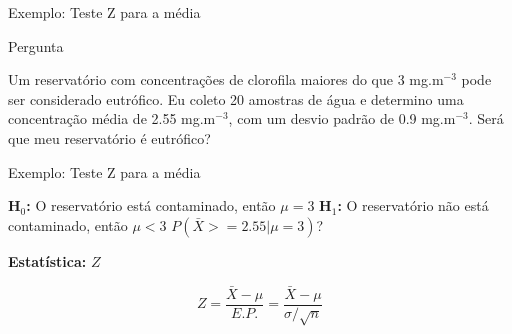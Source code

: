 \documentclass{beamer}\usepackage[]{graphicx}\usepackage[]{color}
\begin{document}
\begin{frame}{Exemplo: Teste Z para a média}

\begin{block}{Pergunta}

Um reservatório com concentrações de clorofila maiores do que 3 mg.m$^{-3}$ pode ser considerado eutrófico. Eu coleto 20 amostras de água e determino uma concentração média de 2.55 mg.m$^{-3}$, com um desvio padrão de 0.9 mg.m$^{-3}$. Será que meu reservatório é eutrófico? 

\end{block}

\end{frame} 

\begin{frame}{Exemplo: Teste Z para a média}

\textbf{H$_0$:} O reservatório está contaminado, então $\mu = 3$
\vfill
\textbf{H$_1$:} O reservatório não está contaminado, então $\mu < 3$
\vfill
$P(\bar{X} >= 2.55 | \mu = 3)$?
\vfill

\textbf{Estatística:} $Z$

\vfill

\begin{equation*}
    Z = \frac{\bar{X} - \mu}{E.P.} = \frac{\bar{X} - \mu}{\sigma / \sqrt{n}}
\end{equation*}

\vfill


\end{frame} 
\end{document}
